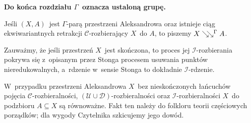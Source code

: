 \textbf{Do końca rozdziału $\Gamma$~oznacza ustaloną grupę.}

Jeśli $(X,A)$~jest $\Gamma$-parą przestrzeni Aleksandrowa oraz istnieje ciąg ekwiwariantnych retrakcji $\mathcal{C}$-rozbierający $X$~do $A$, to piszemy $X\searrow\!\!\searrow^\Gamma A$.

Zauważmy, że jeśli przestrzeń $X$~jest skończona, to proces jej $\mathcal{I}$-rozbierania pokrywa się z~opisanym przez Stonga procesem usuwania punktów nieredukowalnych, a~rdzenie w~sensie Stonga to dokładnie $\mathcal{I}$-rdzenie.

W~przypadku przestrzeni Aleksandrowa $X$~bez nieskończonych łańcuchów pojęcia $\mathcal{C}$-rozbieralności, $(\mathcal{U}\cup\mathcal{D})$-rozbieralności oraz $\mathcal{I}$-rozbieralności $X$~do podzbioru $A\subseteq X$ są równoważne. Fakt ten należy do folkloru teorii częściowych porządków; dla wygody Czytelnika szkicujemy jego dowód.

